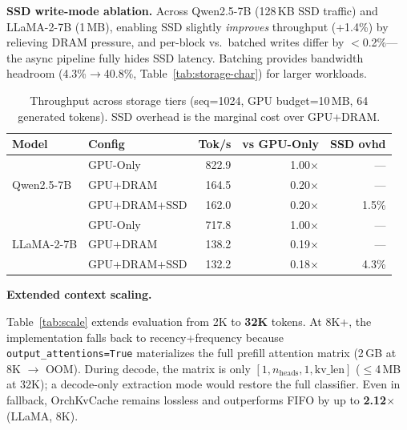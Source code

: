 \documentclass[conference]{IEEEtran}
\begin{document}
\textbf{SSD write-mode ablation.} Across Qwen2.5-7B (128\,KB SSD traffic) and LLaMA-2-7B (1\,MB), enabling SSD slightly \emph{improves} throughput (+1.4\%) by relieving DRAM pressure, and per-block vs.\ batched writes differ by $<$0.2\%---the async pipeline fully hides SSD latency. Batching provides bandwidth headroom (4.3\%$\to$40.8\%, Table~\ref{tab:storage-char}) for larger workloads.

\begin{table}[t]
\centering
\caption{Throughput across storage tiers (seq=1024, GPU budget=10\,MB, 64 generated tokens). SSD overhead is the marginal cost over GPU+DRAM.}
\label{tab:tier-throughput}
\footnotesize
\setlength{\tabcolsep}{4pt}
\begin{tabular}{@{}llrrr@{}}
\toprule
Model & Config & Tok/s & vs GPU-Only & SSD ovhd \\
\midrule
\multirow{3}{*}{Qwen2.5-7B}
& GPU-Only     & 822.9 & 1.00$\times$ & --- \\
& GPU+DRAM     & 164.5 & 0.20$\times$ & --- \\
& GPU+DRAM+SSD & 162.0 & 0.20$\times$ & 1.5\% \\
\midrule
\multirow{3}{*}{LLaMA-2-7B}
& GPU-Only     & 717.8 & 1.00$\times$ & --- \\
& GPU+DRAM     & 138.2 & 0.19$\times$ & --- \\
& GPU+DRAM+SSD & 132.2 & 0.18$\times$ & 4.3\% \\
\bottomrule
\end{tabular}
\end{table}

\textbf{Extended context scaling.}
\label{sec:scale}

Table~\ref{tab:scale} extends evaluation from 2K to \textbf{32K} tokens. At 8K+, the implementation falls back to recency+frequency because \texttt{output\_attentions=True} materializes the full prefill attention matrix (2\,GB at 8K $\to$ OOM). During decode, the matrix is only $[1, n_{\text{heads}}, 1, \text{kv\_len}]$ ($\leq$4\,MB at 32K); a decode-only extraction mode would restore the full classifier. Even in fallback, OrchKvCache remains lossless and outperforms FIFO by up to \textbf{2.12$\times$} (LLaMA, 8K).
\end{document}
